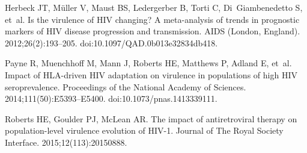 \documentclass[10pt,letterpaper]{article}
\begin{document}
\begin{thebibliography}{10}
Herbeck JT, Müller V, Maust BS, Ledergerber B, Torti C, Di~Giambenedetto S,
  et~al.
\newblock Is the virulence of {HIV} changing? {A} meta-analysis of trends in
  prognostic markers of {HIV} disease progression and transmission.
\newblock AIDS (London, England). 2012;26(2):193--205.
\newblock doi:{10.1097/QAD.0b013e32834db418}.

Payne R, Muenchhoff M, Mann J, Roberts HE, Matthews P, Adland E, et~al.
\newblock Impact of {HLA}-driven {HIV} adaptation on virulence in populations
  of high {HIV} seroprevalence.
\newblock Proceedings of the National Academy of Sciences.
  2014;111(50):E5393--E5400.
\newblock doi:{10.1073/pnas.1413339111}.

Roberts HE, Goulder PJ, McLean AR.
\newblock The impact of antiretroviral therapy on population-level virulence
  evolution of {HIV}-1.
\newblock Journal of The Royal Society Interface. 2015;12(113):20150888.

\end{thebibliography}
\end{document}
